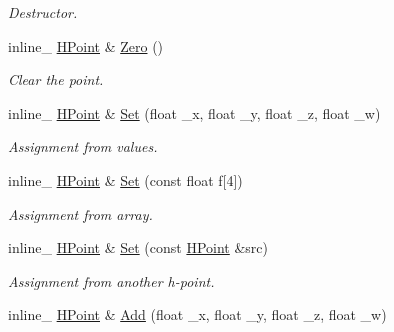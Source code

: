 \begin{DoxyCompactItemize}
\begin{DoxyCompactList}\small\item\em Destructor. \end{DoxyCompactList}\item 
inline\+\_\+ \hyperlink{classOpcode_1_1HPoint}{H\+Point} \& \hyperlink{classOpcode_1_1HPoint_ad74f450e0d640f88a1d99e83758dc5fe}{Zero} ()\hypertarget{classOpcode_1_1HPoint_ad74f450e0d640f88a1d99e83758dc5fe}{}\label{classOpcode_1_1HPoint_ad74f450e0d640f88a1d99e83758dc5fe}

\begin{DoxyCompactList}\small\item\em Clear the point. \end{DoxyCompactList}\item 
inline\+\_\+ \hyperlink{classOpcode_1_1HPoint}{H\+Point} \& \hyperlink{classOpcode_1_1HPoint_ad261637b668bc0640c665834c7f6617a}{Set} (float \+\_\+x, float \+\_\+y, float \+\_\+z, float \+\_\+w)\hypertarget{classOpcode_1_1HPoint_ad261637b668bc0640c665834c7f6617a}{}\label{classOpcode_1_1HPoint_ad261637b668bc0640c665834c7f6617a}

\begin{DoxyCompactList}\small\item\em Assignment from values. \end{DoxyCompactList}\item 
inline\+\_\+ \hyperlink{classOpcode_1_1HPoint}{H\+Point} \& \hyperlink{classOpcode_1_1HPoint_ab566cdde88f205514399f1c7bb18b331}{Set} (const float f\mbox{[}4\mbox{]})\hypertarget{classOpcode_1_1HPoint_ab566cdde88f205514399f1c7bb18b331}{}\label{classOpcode_1_1HPoint_ab566cdde88f205514399f1c7bb18b331}

\begin{DoxyCompactList}\small\item\em Assignment from array. \end{DoxyCompactList}\item 
inline\+\_\+ \hyperlink{classOpcode_1_1HPoint}{H\+Point} \& \hyperlink{classOpcode_1_1HPoint_a8fb02a488b3bcab9c48039955d105621}{Set} (const \hyperlink{classOpcode_1_1HPoint}{H\+Point} \&src)\hypertarget{classOpcode_1_1HPoint_a8fb02a488b3bcab9c48039955d105621}{}\label{classOpcode_1_1HPoint_a8fb02a488b3bcab9c48039955d105621}

\begin{DoxyCompactList}\small\item\em Assignment from another h-\/point. \end{DoxyCompactList}\item 
inline\+\_\+ \hyperlink{classOpcode_1_1HPoint}{H\+Point} \& \hyperlink{classOpcode_1_1HPoint_a8ba0438e1bb7c426cc6eeaae01590d44}{Add} (float \+\_\+x, float \+\_\+y, float \+\_\+z, float \+\_\+w)\hypertarget{classOpcode_1_1HPoint_a8ba0438e1bb7c426cc6eeaae01590d44}{}\label{classOpcode_1_1HPoint_a8ba0438e1bb7c426cc6eeaae01590d44}


\end{DoxyCompactItemize}
